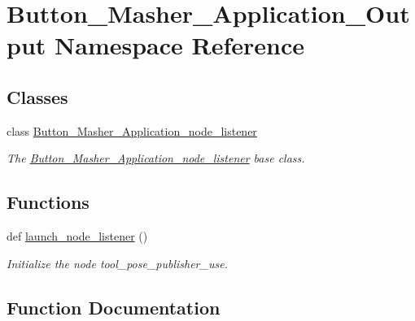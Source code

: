 \hypertarget{namespaceButton__Masher__Application__Output}{}\section{Button\+\_\+\+Masher\+\_\+\+Application\+\_\+\+Output Namespace Reference}
\label{namespaceButton__Masher__Application__Output}
\subsection*{Classes}
\begin{DoxyCompactItemize}
\item 
class \hyperlink{classButton__Masher__Application__Output_1_1Button__Masher__Application__node__listener}{Button\+\_\+\+Masher\+\_\+\+Application\+\_\+node\+\_\+listener}
\begin{DoxyCompactList}\small\item\em The \hyperlink{classButton__Masher__Application__Output_1_1Button__Masher__Application__node__listener}{Button\+\_\+\+Masher\+\_\+\+Application\+\_\+node\+\_\+listener} base class. \end{DoxyCompactList}\end{DoxyCompactItemize}
\subsection*{Functions}
\begin{DoxyCompactItemize}
\item 
def \hyperlink{namespaceButton__Masher__Application__Output_ad537c35a13781c3e28b4e3cc57ba321e}{launch\+\_\+node\+\_\+listener} ()
\begin{DoxyCompactList}\small\item\em Initialize the node tool\+\_\+pose\+\_\+publisher\+\_\+use. \end{DoxyCompactList}\end{DoxyCompactItemize}


\subsection{Function Documentation}
\mbox{\label{namespaceButton__Masher__Application__Output_ad537c35a13781c3e28b4e3cc57ba321e}} 
